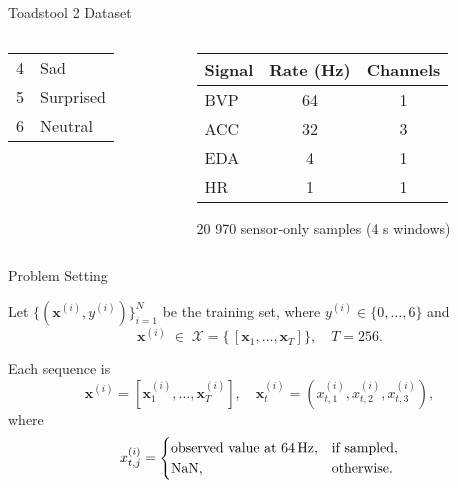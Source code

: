 \begin{frame}{Toadstool 2 Dataset}
\begin{columns}[T]
\begin{column}{0.5\textwidth}
\begin{center}
\begin{columns}[t]
	\centering\footnotesize
	\begin{tabular}{r l}
		4 & Sad        \\
		5 & Surprised  \\
		6 & Neutral
	\end{tabular}
\end{columns}


			\end{center}
			
		\end{column}
		\begin{column}{0.5\textwidth}
		\centering
		\small
		\begin{tabular}{lcc}
		\toprule
		\textbf{Signal} & \textbf{Rate (Hz)} & \textbf{Channels} \\
		\midrule
		BVP  & 64 & 1      \\
		ACC  & 32 & 3 		\\
		EDA  & 4  & 1      \\
		HR   & 1  & 1      \\
		\bottomrule
		\end{tabular}
		
		\begin{block}{}
			20 970 sensor‐only samples (4 s windows)
		\end{block}

		\end{column}
		
	\end{columns}
\end{frame}


\begin{frame}[t]{Problem Setting}
	\begin{block}{}
		Let $\{(\boldsymbol{x}^{(i)},y^{(i)})\}_{i=1}^N$ be the training set, where
		$y^{(i)}\in\{0,\dots,6\}$ and
		\[
		\boldsymbol{x}^{(i)} \;\in\; \mathcal{X}
		= \bigl\{\,[\boldsymbol{x}_1,\dots,\boldsymbol{x}_T]\bigr\},
		\quad T = 256.
		\]
	\end{block}
	\vspace{-0.5em}
	\begin{block}{}
		Each sequence is
		\[
		\boldsymbol{x}^{(i)}
		= [\boldsymbol{x}_1^{(i)}, \dots, \boldsymbol{x}_T^{(i)}],
		\quad
		\boldsymbol{x}_t^{(i)} = (x_{t,1}^{(i)}, x_{t,2}^{(i)}, x_{t,3}^{(i)}),
		\]
		where 
		\[
		x_{t,j}^{(i)} =
		\begin{cases}
			\text{observed value at 64\,Hz}, & \text{if sampled},\\
			\mathrm{NaN},                    & \text{otherwise}.
		\end{cases}
		\]
	\end{block}
\end{frame}

